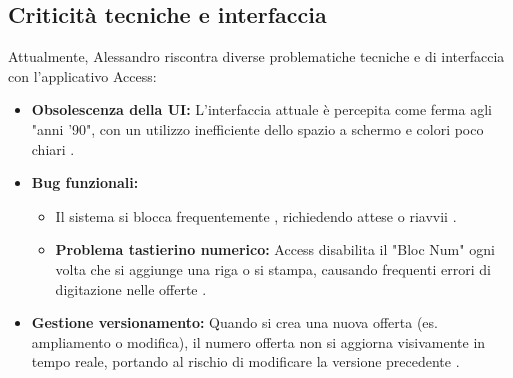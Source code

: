 \documentclass[12pt, a4paper]{article} %
\begin{document}
\subsection{Criticità tecniche e interfaccia}
Attualmente, Alessandro riscontra diverse problematiche tecniche e di
interfaccia con l'applicativo Access:
\begin{itemize}
      \item \textbf{Obsolescenza della UI:} L'interfaccia attuale è percepita come ferma agli "anni '90", con un utilizzo inefficiente dello spazio a schermo e colori poco chiari .
      \item \textbf{Bug funzionali:}
            \begin{itemize}
                  \item Il sistema si blocca frequentemente , richiedendo attese o riavvii .
                  \item \textbf{Problema tastierino numerico:} Access disabilita il "Bloc Num" ogni volta che si aggiunge una riga o si stampa,
                        causando frequenti errori di digitazione nelle offerte .
            \end{itemize}
      \item \textbf{Gestione versionamento:} Quando si crea una nuova offerta (es. ampliamento o modifica), il numero offerta non si aggiorna visivamente in tempo reale,
            portando al rischio di modificare la versione precedente .
\end{itemize}
\end{document}
